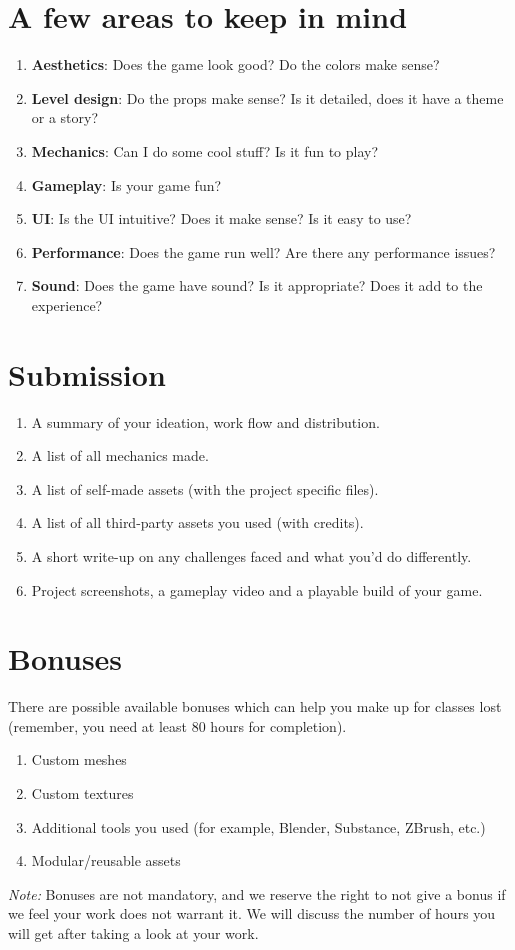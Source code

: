 \documentclass{article}
\begin{document}
\section{A few areas to keep in mind}
\begin{enumerate}
    \item \textbf{Aesthetics}: Does the game look good? Do the colors make sense? 
    \item \textbf{Level design}: Do the props make sense? Is it detailed, does it have a theme or a story?
    \item \textbf{Mechanics}: Can I do some cool stuff? Is it fun to play? 
    \item \textbf{Gameplay}: Is your game fun? 
    \item \textbf{UI}: Is the UI intuitive? Does it make sense? Is it easy to use?
    \item \textbf{Performance}: Does the game run well? Are there any performance issues?
    \item \textbf{Sound}: Does the game have sound? Is it appropriate? Does it add to the experience?
\end{enumerate}

\section{Submission}
\begin{enumerate}
    \item A summary of your ideation, work flow and distribution.
    \item A list of all mechanics made.
    \item A list of self-made assets (with the project specific files).
    \item A list of all third-party assets you used (with credits).
    \item A short write-up on any challenges faced and what you'd do differently.
    \item Project screenshots, a gameplay video and a playable build of your game.
\end{enumerate}

\section{Bonuses}
There are possible available bonuses which can help you make up for classes lost (remember, you need at least 80 hours for completion).
\begin{enumerate}
    \item Custom meshes
    \item Custom textures
    \item Additional tools you used (for example, Blender, Substance, ZBrush, etc.)
    \item Modular/reusable assets
\end{enumerate}
\emph{Note:} Bonuses are not mandatory, and we reserve the right to not give a bonus if we feel your work does not warrant it. We will discuss the number of hours you will get after taking a look at your work.
\end{document}
